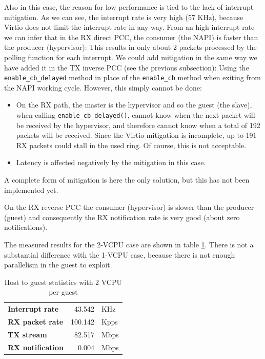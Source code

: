 Also in this case, the reason for low performance is tied to the lack of interrupt mitigation. As we can see, the interrupt rate is
very high (57 KHz), because Virtio does not limit the interrupt rate in any way. From an high interrupt rate we can infer that in the 
RX direct PCC, the consumer (the NAPI) is faster than the producer (hypervisor): This results in only about 2
packets processed by the polling function for each interrupt.
We could add mitigation in the same way we have added it in the TX inverse PCC (see the previous subsection): Using
the \texttt{enable\_cb\_delayed} method in place of the \texttt{enable\_cb} method when exiting from the NAPI working cycle.
However, this simply cannot be done:
\begin{itemize}
  \item On the RX path, the master is the hypervisor and so the guest (the slave), when calling
	\texttt{enable\_cb\_delayed()}, cannot know when the next packet will be received by the hypervisor, and therefore cannot know
	when a total of 192 packets will be received. Since the Virtio mitigation is incomplete, up to 191 RX packets could stall
	in the used ring. Of course, this is not acceptable.
  \item Latency is affected negatively by the mitigation in this case.
\end{itemize}
A complete form of mitigation is here the only solution, but this has not been implemented yet.

\vspace{0.5cm}

On the RX reverse PCC the consumer (hypervisor) is slower than the producer (guest) and consequently the RX notification rate is
very good (about zero notifications).

\vspace{0.5cm}

The measured results for the 2-VCPU case are shown in table \ref{tab:virtionet-rx-g2hvcpu}. There is not a substantial difference with
the 1-VCPU case, because there is not enough parallelism in the guest to exploit.

\begin{table}
\begin{center}
\begin{tabular}{lrl}
\toprule
\textbf{Interrupt rate} & 43.542 & KHz\\
\textbf{RX packet rate} & 100.142 & Kpps\\
\textbf{TX stream} & 82.517 & Mbps\\
\textbf{RX notification} & 0.004 & Mbps\\
\bottomrule
\end{tabular}
\end{center}
\caption{Host to guest statistics with 2 VCPU per guest}
\label{tab:virtionet-rx-g2hvcpu}
\end{table}



